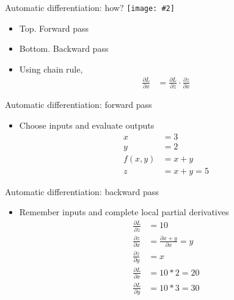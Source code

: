 \documentclass[hyperref={pdfpagelabels=false},12pt]{beamer}
\newcommand{\ig}[2]{\texttt{[image: \#2]}}
\begin{document}
\begin{frame}{Automatic differentiation: how?}
  \centering
  \ig{0.5}{figures/autograd.png}
  \begin{itemize}
      \item Top. Forward pass
      \item Bottom. Backward pass
      \item Using chain rule,
        \begin{align*}
          \frac{\partial L}{\partial x} &= \frac{\partial L}{\partial z} \cdot
                    \frac{\partial z}{\partial x}
        \end{align*}
  \end{itemize}
\end{frame}

\begin{frame}{Automatic differentiation: forward pass}
  \begin{itemize}
    \item Choose inputs and evaluate outputs
      \begin{align*}
        x &= 3 \\
        y &= 2 \\
        f(x, y) &= x + y \\
        z &= x + y = 5
      \end{align*}
  \end{itemize}
\end{frame}

\begin{frame}{Automatic differentiation: backward pass}
  \begin{itemize}
    \item Remember inputs and complete local partial derivatives
      \begin{align*}
        \frac{\partial L}{\partial z} &= 10 \\
        \frac{\partial z}{\partial x} &= \frac{\partial x + y}{\partial x} = y \\
        \frac{\partial z}{\partial y} &= x \\
        \frac{\partial L}{\partial x} &= 10 * 2 = 20 \\
        \frac{\partial L}{\partial y} &= 10 * 3 = 30 \\
      \end{align*}
  \end{itemize}
\end{frame}
\end{document}
